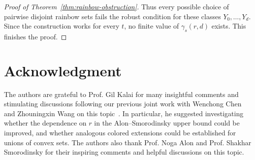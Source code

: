 \documentclass[11pt]{article}
\theoremstyle{definition}
\begin{document}
\begin{proof}[Proof of Theorem~\ref{thm:rainbow-obstruction}]
Thus every possible choice of pairwise disjoint rainbow sets fails the robust condition for these classes \(Y_{0},\ldots,Y_{d}\). Since the construction works for every \(t\), no finite value of \(\gamma_{s}(r,d)\) exists. This finishes the proof.
\end{proof}


\section*{Acknowledgment}
The authors are grateful to Prof. Gil Kalai for many insightful comments and stimulating discussions following our previous joint work with Wenchong Chen and Zhouningxin Wang on this topic~\cite{ChenGeShuWangXu2025}. In particular, he suggested investigating whether the dependence on \(r\) in the Alon--Smorodinsky upper bound could be improved, and whether analogous colored extensions could be established for unions of convex sets. The authors also thank Prof. Noga Alon and Prof. Shakhar Smorodinsky for their inspiring comments and helpful discussions on this topic.




\end{document}
